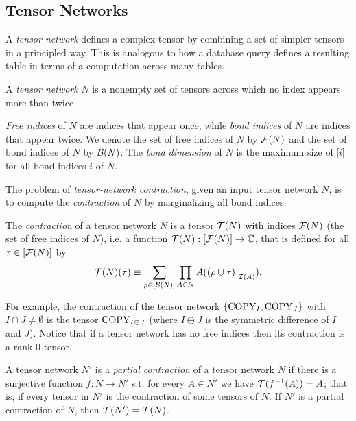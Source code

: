 \subsection{Tensor Networks}
\label{sec:tensors:tensors:tensor-networks}
A \emph{tensor network} defines a complex tensor by combining a set of simpler tensors in a principled way. This is analogous to how a database query defines a resulting table in terms of a computation across many tables.

\begin{definition}
	\label{def:tensor-contraction-network}
	A \emph{tensor network} $N$ is a nonempty set of tensors across which no index appears more than twice.
\end{definition}

\emph{Free indices} of $N$ are indices that appear once, while \emph{bond indices} of $N$ are indices that appear twice. We denote the set of free indices of $N$ by $\mathcal{F}(N)$ and the set of bond indices of $N$ by $\mathcal{B}(N)$. The \emph{bond dimension} of $N$ is the maximum size of $[i]$ for all bond indices $i$ of $N$.

The problem of \emph{tensor-network contraction}, given an input tensor network $N$, is to compute the \emph{contraction} of $N$ by marginalizing all bond indices:
\begin{definition}\label{def:contraction}
The \emph{contraction} of a tensor network $N$ is a tensor $\mathcal{T}(N)$ with indices $\mathcal{F}(N)$ (the set of free indices of $N$), i.e. a function $\mathcal{T}(N) : [\mathcal{F}(N)] \rightarrow \mathbb{C}$, that is defined for all $\tau \in [\mathcal{F}(N)]$ by
		\begin{equation}
        \label{eqn:contraction} 
        \mathcal{T}(N)(\tau) \equiv \sum_{\rho \in [\mathcal{B}(N)]} \prod_{A \in N} A((\rho \cup \tau)\big|_{\mathcal{I}(A)}).
        \end{equation}
\end{definition}

For example, the contraction of the tensor network $\{\text{COPY}_I, \text{COPY}_J\}$ with $I \cap J \neq \emptyset$ is the tensor $\text{COPY}_{I \oplus J}$ (where $I \oplus J$ is the symmetric difference of $I$ and $J$). Notice that if a tensor network has no free indices then its contraction is a rank 0 tensor. 

A tensor network $N'$ is a \emph{partial contraction} of a tensor network $N$ if there is a surjective function $f: N \rightarrow N'$ s.t. for every $A \in N'$ we have $\mathcal{T}(f^{-1}(A)) = A$; that is, if every tensor in $N'$ is the contraction of some tensors of $N$. If $N'$ is a partial contraction of $N$, then $\mathcal{T}(N') = \mathcal{T}(N)$.

